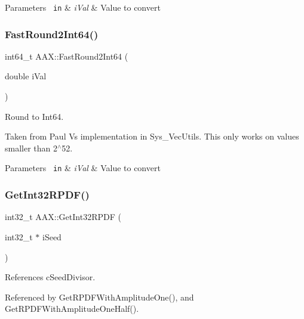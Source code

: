 \begin{DoxyParams}[1]{Parameters}
\mbox{\texttt{ in}}  & {\em i\+Val} & Value to convert \\
\hline
\end{DoxyParams}
\mbox{\label{a00852_a7df6b095ea2469f2adce2a895038212e}} 
\subsubsection{\texorpdfstring{FastRound2Int64()}{FastRound2Int64()}}
{\footnotesize\ttfamily int64\+\_\+t A\+A\+X\+::\+Fast\+Round2\+Int64 (\begin{DoxyParamCaption}\item[{double}]{i\+Val }\end{DoxyParamCaption})\hspace{0.3cm}{\ttfamily [inline]}}



Round to Int64. 

Taken from Paul V\textquotesingle{}s implementation in Sys\+\_\+\+Vec\+Utils. This only works on values smaller than 2$^\wedge$52.


\begin{DoxyParams}[1]{Parameters}
\mbox{\texttt{ in}}  & {\em i\+Val} & Value to convert \\
\hline
\end{DoxyParams}
\mbox{\label{a00852_af3435129d3c94c5f3d5e671943b9bbe2}} 
\subsubsection{\texorpdfstring{GetInt32RPDF()}{GetInt32RPDF()}}
{\footnotesize\ttfamily int32\+\_\+t A\+A\+X\+::\+Get\+Int32\+R\+P\+DF (\begin{DoxyParamCaption}\item[{int32\+\_\+t $\ast$}]{i\+Seed }\end{DoxyParamCaption})\hspace{0.3cm}{\ttfamily [inline]}}



References c\+Seed\+Divisor.



Referenced by Get\+R\+P\+D\+F\+With\+Amplitude\+One(), and Get\+R\+P\+D\+F\+With\+Amplitude\+One\+Half().

